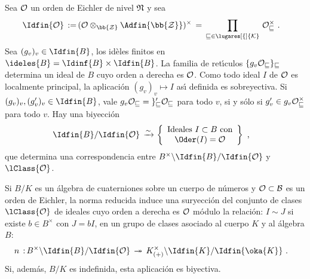 Sea $\cal{O}$ un orden de Eichler de nivel $\frak{N}$ y sea
\begin{align*}
	\Idfin{\cal{O}}\,:=\, &
	(\cal{O}\otimes_{\bb{Z}}\Adfin{\bb{Z}})^{\times}
	\,=\, \prod_{v\in\lugares[f]{K}}\,\cal{O}_{v}^{\times}
	\text{ .}
\end{align*}
%
Sea $(g_{v})_{v}\in\Idfin{B}$, los id\`{e}les finitos en
$\ideles{B}=\Idinf{B}\times\Idfin{B}$. La familia de ret\'{\i}culos
$\{g_{v}\cal{O}_{v}\}_{v}$ determina un ideal de $B$
cuyo orden a derecha es $\cal{O}$.
Como todo ideal $I$ de $\cal{O}$ es localmente principal, la aplicaci\'{o}n
$(g_{v})_{v}\mapsto I$ as\'{\i} definida es sobreyectiva. Si
$(g_{v})_{v},(g'_{v})_{v}\in\Idfin{B}$, vale
$g_{v}\cal{O}_{v}=g'_{v}\cal{O}_{v}$ para todo $v$, si y s\'{o}lo si
$g'_{v}\in g_{v}\cal{O}_{v}^{\times}$ para todo $v$. Hay una biyecci\'{o}n
\begin{align*}
	\Idfin{B}/\Idfin{\cal{O}}\,\xrightarrow{\sim}\, &
	\left\lbrace
	\begin{array}{c}
		\text{Ideales }I\subset B\text{ con} \\
		\Oder(I)=\cal{O}
	\end{array}
	\right\rbrace
	\text{ ,}
\end{align*}
%
que determina una correspondencia entre
$B^{\times}\backslash\Idfin{B}/\Idfin{\cal{O}}$ y $\lClass{\cal{O}}$.

\begin{teoEichlerNormaClases}[Eichler]
	Si $B/K$ es un \'{a}lgebra de cuaterniones sobre un cuerpo de
	n\'{u}meros y $\cal{O}\subset B$ es un orden de Eichler, la
	norma reducida induce una suryecci\'{o}n del conjunto de clases
	$\lClass{\cal{O}}$ de ideales cuyo orden a derecha es $\cal{O}$
	m\'{o}dulo la relaci\'{o}n: $I\sim J$ si existe $b\in B^{\times}$
	con $J=bI$, en un grupo de clases asociado al cuerpo $K$ y al
	\'{a}lgebra $B$:
	\begin{align*}
		n\,:\, & B^{\times}\backslash \Idfin{B}/\Idfin{\cal{O}}
		\,\twoheadrightarrow\,
		K_{(+)}^{\times}\backslash\Idfin{K}/\Idfin{\oka{K}}
		\text{ .}
	\end{align*}
	Si, adem\'{a}s, $B/K$ es indefinida, esta aplicaci\'{o}n es biyectiva.
\end{teoEichlerNormaClases}

